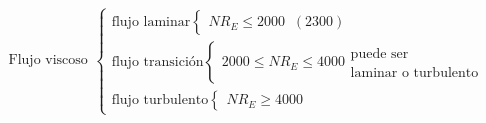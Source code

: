 \[
    \begin{array}{c}
         \text{Flujo viscoso}
    \end{array}
    \left\{ 
        \begin{array}{l}
             \text{flujo laminar} 
                \left\{
                    \begin{array}{l}
                        NR_{E} \leq 2000 \;\; (2300) 
                    \end{array}
                 \right.\\ 
             \text{flujo transición} 
                \left\{
                    \begin{array}{l}
                         2000 \leq NR_{E} \leq 4000
                            \begin{array}{l}
                                \text{puede ser}\\
                                \text{laminar o turbulento}
                            \end{array}
                    \end{array}
                \right.\\ 
             \text{flujo turbulento} 
                \left\{
                    \begin{array}{l}
                         NR_{E} \geq 4000
                    \end{array}
                \right.
        \end{array}
    \right.    
\]
